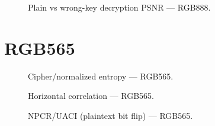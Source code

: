 \documentclass{article}
\begin{document}
\begin{figure}[htbp]
  \centering
  
  \caption{Plain vs wrong-key decryption PSNR --- RGB888.}
\end{figure}

\clearpage

\section{RGB565}
\begin{figure}[htbp]
  \centering
  
  \caption{Cipher/normalized entropy --- RGB565.}
\end{figure}

\begin{figure}[htbp]
  \centering
  
  \caption{Horizontal correlation --- RGB565.}
\end{figure}

\begin{figure}[htbp]
  \centering
  
  \caption{NPCR/UACI (plaintext bit flip) --- RGB565.}
\end{figure}

\clearpage
\end{document}
